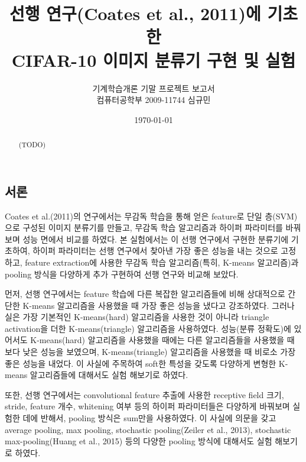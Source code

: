 \documentclass[a4paper,9pt]{article}
\begin{document}
\title{선행 연구(Coates et al., 2011)에 기초한 \\
CIFAR-10 이미지 분류기 구현 및 실험}
\author{기계학습개론 기말 프로젝트 보고서 \\
컴퓨터공학부 2009-11744 심규민}
\date{\koreandate\today}

\maketitle

\begin{abstract}
(TODO)
\end{abstract}

\tableofcontents

\pagebreak

\begin{multicols*}{2}

\section{서론}

Coates et al.(2011)의 연구에서는 무감독 학습을 통해 얻은 feature로 단일 층(SVM)으로 구성된 이미지 분류기를 만들고, 무감독 학습 알고리즘과 하이퍼 파라미터를 바꿔보며 성능 면에서 비교를 하였다.
본 실험에서는 이 선행 연구에서 구현한 분류기에 기초하여, 하이퍼 파라미터는 선행 연구에서 찾아낸 가장 좋은 성능을 내는 것으로 고정하고, feature extraction에 사용한 무감독 학습 알고리즘(특히, K-means 알고리즘)과 pooling 방식을 다양하게 추가 구현하여 선행 연구와 비교해 보았다.

먼저, 선행 연구에서는 feature 학습에 다른 복잡한 알고리즘들에 비해 상대적으로 간단한 K-means 알고리즘을 사용했을 때 가장 좋은 성능을 냈다고 강조하였다.
그러나 실은 가장 기본적인 K-means(hard) 알고리즘을 사용한 것이 아니라 triangle activation을 더한 K-means(triangle) 알고리즘을 사용하였다.
성능(분류 정확도)에 있어서도 K-means(hard) 알고리즘을 사용했을 때에는 다른 알고리즘들을 사용했을 때 보다 낮은 성능을 보였으며, K-means(triangle) 알고리즘을 사용했을 때 비로소 가장 좋은 성능을 내었다.
이 사실에 주목하여 soft한 특성을 갖도록 다양하게 변형한 K-means 알고리즘들에 대해서도 실험 해보기로 하였다.

또한, 선행 연구에서는 convolutional feature 추출에 사용한 receptive field 크기, stride, feature 개수, whitening 여부 등의 하이퍼 파라미터들은 다양하게 바꿔보며 실험한 데에 반해서, pooling 방식은 sum만을 사용하였다.
이 사실에 의문을 갖고 average pooling, max pooling, stochastic pooling(Zeiler et al., 2013), stochastic max-pooling(Huang et al., 2015) 등의 다양한 pooling 방식에 대해서도 실험 해보기로 하였다.


\end{multicols*}
\end{document}
